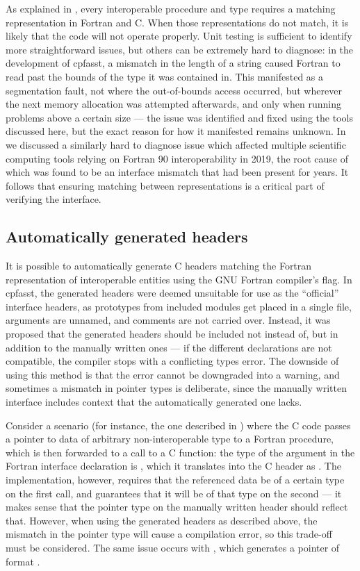 As explained in , every interoperable procedure and type requires a matching representation in Fortran and C. When those representations do not match, it is likely that the code will not operate properly. Unit testing is sufficient to identify more straightforward issues, but others can be extremely hard to diagnose: in the development of cpfasst, a mismatch in the length of a string caused Fortran to read past the bounds of the type it was contained in. This manifested as a segmentation fault, not where the out-of-bounds access occurred, but wherever the next memory allocation was attempted afterwards, and only when running problems above a certain size --- the issue was identified and fixed using the tools discussed here, but the exact reason for how it manifested remains unknown. In  we discussed a similarly hard to diagnose issue which affected multiple scientific computing tools relying on Fortran 90 interoperability in 2019, the root cause of which was found to be an interface mismatch that had been present for years. It follows that ensuring matching between representations is a critical part of verifying the interface.

\subsection*{Automatically generated headers}

It is possible to automatically generate C headers matching the Fortran representation of interoperable entities using the GNU Fortran compiler's  flag. In cpfasst, the generated headers were deemed unsuitable for use as the ``official'' interface headers, as prototypes from included modules get placed in a single file, arguments are unnamed, and comments are not carried over. Instead, it was proposed that the generated headers should be included not instead of, but in addition to the manually written ones ---  if the different declarations are not compatible, the compiler stops with a conflicting types error. The downside of using this method is that the error cannot be downgraded into a warning, and sometimes a mismatch in pointer types is deliberate, since the manually written interface includes context that the automatically generated one lacks.

Consider a scenario (for instance, the one described in ) where the C code passes a pointer to data of arbitrary non-interoperable type to a Fortran procedure, which is then forwarded to a call to a C function: the type of the argument in the Fortran interface declaration is , which it translates into the C header as . The implementation, however, requires that the referenced data be of a certain type on the first call, and guarantees that it will be of that type on the second --- it makes sense that the pointer type on the manually written header should reflect that. However, when using the generated headers as described above, the mismatch in the pointer type will cause a compilation error, so this trade-off must be considered. The same issue occurs with , which generates a pointer of format .

